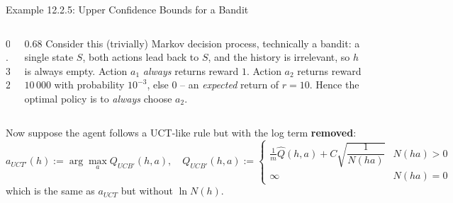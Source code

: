 \documentclass[aspectratio=169,10pt]{beamer}
\begin{document}
\begin{frame}{Example 12.2.5: Upper Confidence Bounds for a Bandit}
\small
\begin{columns}[T]
\begin{column}{0.32\textwidth}
\centering
{}
\end{column}
\begin{column}{0.68\textwidth}
Consider this (trivially) Markov decision process, technically a bandit: a single state
$S$, both actions lead back to $S$, and the history is irrelevant, so $h$ is always empty.
Action $a_1$ \emph{always} returns reward $1$. Action $a_2$ returns reward $10\,000$ with
probability $10^{-3}$, else $0$ -- an \emph{expected} return of $r=10$. Hence the optimal
policy is to \emph{always} choose $a_2$.
\end{column}
\end{columns}
\vspace{0.15cm}
Now suppose the agent follows a UCT-like rule but with the log term \textbf{removed}:
$$a_{UCT'}(h):=\arg\max_a Q_{UCB'}(h,a),\quad
Q_{UCB'}(h,a):=\begin{cases}\frac1m\widehat Q(h,a)+C\sqrt{\dfrac1{N(ha)}} & N(ha)>0\\
\infty & N(ha)=0\end{cases}$$
which is the same as $a_{UCT}$ but without $\ln N(h)$.
\end{frame}
\end{document}

